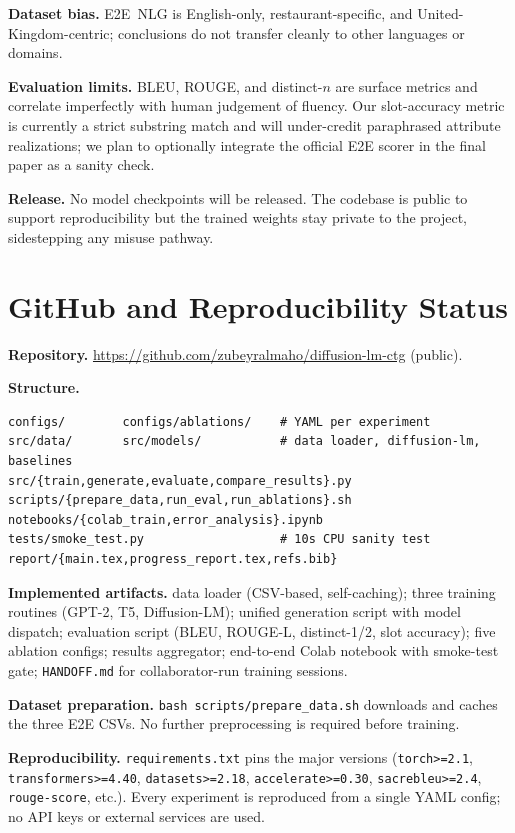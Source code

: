 \documentclass[11pt,a4paper]{article}
\begin{document}
\textbf{Dataset bias.} E2E~NLG is English-only, restaurant-specific, and
United-Kingdom-centric; conclusions do not transfer cleanly to other
languages or domains.

\textbf{Evaluation limits.} BLEU, ROUGE, and distinct-$n$ are surface metrics
and correlate imperfectly with human judgement of fluency. Our slot-accuracy
metric is currently a strict substring match and will under-credit
paraphrased attribute realizations; we plan to optionally integrate the
official E2E scorer in the final paper as a sanity check.

\textbf{Release.} No model checkpoints will be released. The codebase is
public to support reproducibility but the trained weights stay private to
the project, sidestepping any misuse pathway.

\section{GitHub and Reproducibility Status}
\label{sec:repo}

\textbf{Repository.} \url{https://github.com/zubeyralmaho/diffusion-lm-ctg}
(public).

\textbf{Structure.}
\begin{verbatim}
configs/        configs/ablations/    # YAML per experiment
src/data/       src/models/           # data loader, diffusion-lm, baselines
src/{train,generate,evaluate,compare_results}.py
scripts/{prepare_data,run_eval,run_ablations}.sh
notebooks/{colab_train,error_analysis}.ipynb
tests/smoke_test.py                   # 10s CPU sanity test
report/{main.tex,progress_report.tex,refs.bib}
\end{verbatim}

\textbf{Implemented artifacts.}
data loader (CSV-based, self-caching);
three training routines (GPT-2, T5, Diffusion-LM);
unified generation script with model dispatch;
evaluation script (BLEU, ROUGE-L, distinct-1/2, slot accuracy);
five ablation configs;
results aggregator;
end-to-end Colab notebook with smoke-test gate;
\texttt{HANDOFF.md} for collaborator-run training sessions.

\textbf{Dataset preparation.}
\texttt{bash scripts/prepare\_data.sh} downloads and caches the three E2E
CSVs. No further preprocessing is required before training.

\textbf{Reproducibility.}
\texttt{requirements.txt} pins the major versions
(\texttt{torch>=2.1}, \texttt{transformers>=4.40}, \texttt{datasets>=2.18},
\texttt{accelerate>=0.30}, \texttt{sacrebleu>=2.4}, \texttt{rouge-score},
etc.). Every experiment is reproduced from a single YAML config; no API keys
or external services are used.
\end{document}
